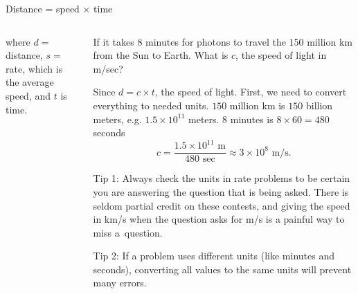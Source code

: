 \documentclass[9pt,aspectratio=169]{beamer}
\begin{document}
\begin{frame}{Distance = speed × time}
\begin{columns}[T]
\begin{column}{0.5\textwidth}
\begin{definition}
        where $d =$ distance, $s =$ rate, which is the average speed, and $t$ is time.
      \end{definition}
    \end{column}
    \begin{column}{0.5\textwidth}
      \begin{problem}
        If it takes $8$ minutes for photons to travel the $150$ million km from the Sun to Earth. What is $c$, the speed of light in m/sec?
      \end{problem}
      Since $d = c \times t$, the speed of light. First, we need to convert everything to needed units. $150$ million km is $150$ billion meters, e.g. $1{.}5 \times 10^{11}$ meters. $8$ minutes is $8 \times 60 = 480$ seconds
      \[ c = \frac{1{.}5 \times 10^{11}\text{ m}}{480\text{ sec}} \approx 3 \times 10^8\text{ m/s}.\]\vspace*{-0.7em}
      \begin{example}
        Tip 1:  Always check the units in rate problems to be certain you are answering the question that is being asked.  There is seldom partial credit on these contests, and giving the speed in km/s when the question asks for m/s is a painful way to miss a~question.

        Tip 2: If a problem uses different units (like minutes and seconds), converting all values to the same units will prevent many errors. 

      \end{example}
    \end{column}
  \end{columns}
\end{frame}
\end{document}
